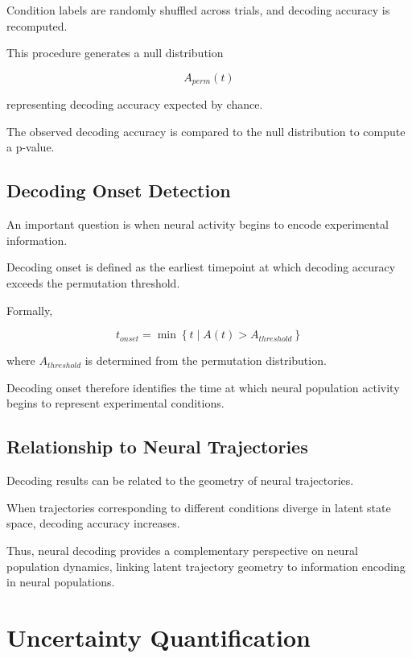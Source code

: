 \documentclass[11pt]{report}
\begin{document}
Condition labels are randomly shuffled across trials, and
decoding accuracy is recomputed.

This procedure generates a null distribution

\begin{equation}
A_{perm}(t)
\end{equation}

representing decoding accuracy expected by chance.

The observed decoding accuracy is compared to the null
distribution to compute a p-value.

\section{Decoding Onset Detection}

An important question is when neural activity begins to encode
experimental information.

Decoding onset is defined as the earliest timepoint at which
decoding accuracy exceeds the permutation threshold.

Formally,

\begin{equation}
t_{onset} =
\min
\left\{
t \mid
A(t) > A_{threshold}
\right\}
\end{equation}

where $A_{threshold}$ is determined from the permutation
distribution.

Decoding onset therefore identifies the time at which neural
population activity begins to represent experimental conditions.

\section{Relationship to Neural Trajectories}

Decoding results can be related to the geometry of neural
trajectories.

When trajectories corresponding to different conditions diverge
in latent state space, decoding accuracy increases.

Thus, neural decoding provides a complementary perspective on
neural population dynamics, linking latent trajectory geometry
to information encoding in neural populations.


\chapter{Uncertainty Quantification}
\end{document}
